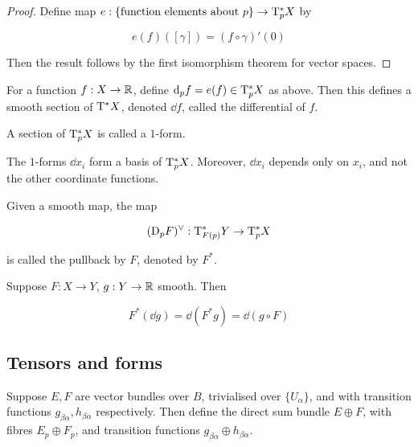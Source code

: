 \begin{proof}
    Define map \(e : \{\text{function elements about }p\} \to \mathrm{T}_p^*X\) by

    \[e(f)([\gamma]) = (f \circ \gamma)'(0)\]

    Then the result follows by the first isomorphism theorem for vector spaces.
\end{proof}

\begin{definition}
     For a function \(f : X \to \mathbb{R}\), define \(\dd_p f = e(f) \in \mathrm{T}_p^*X\) as above. Then this defines a smooth section of \(\mathrm{T}^*X\), denoted \(\dd f\), called the differential of \(f\).
\end{definition}

\begin{definition}
    [\(1\)-form] A section of \(\mathrm{T}_p^*X\) is called a \(1\)-form.
\end{definition}

\begin{remark}
    The \(1\)-forms \(\dd x_i\) form a basis of \(\mathrm{T}_p^*X\). Moreover, \(\dd x_i\) depends only on \(x_i\), and not the other coordinate functions.
\end{remark}

\begin{definition}
    [pullback] Given a smooth map, the map

    \[(\mathrm{D}_p F)^\vee : \mathrm{T}_{F(p)}^* Y \to \mathrm{T}_p^* X\]

    is called the pullback by \(F\), denoted by \(F^*\).
\end{definition}

\begin{lemma}
    Suppose \(F : X \to Y\), \(g : Y \to \mathbb{R}\) smooth. Then

    \[F^*(\dd g) = \dd (F^*g) = \dd (g \circ F)\]
\end{lemma}

\subsection{Tensors and forms}

\begin{definition}
     Suppose \(E, F\) are vector bundles over \(B\), trivialised over \(\{U_\alpha\}\), and with transition functions \(g_{\beta\alpha}, h_{\beta\alpha}\) respectively. Then define the direct sum bundle \(E \oplus F\), with fibres \(E_p \oplus F_p\), and transition functions \(g_{\beta\alpha} \oplus h_{\beta\alpha}\). 
\end{definition}

